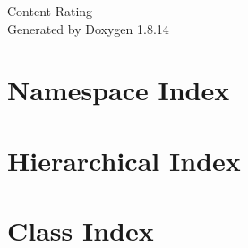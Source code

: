 \documentclass[twoside]{book}
\newcommand{\+}{\discretionary{\mbox{\scriptsize$\hookleftarrow$}}{}{}}
\newcommand{\clearemptydoublepage}{%
  \newpage{\pagestyle{empty}\cleardoublepage}%
}
\begin{document}
\hypersetup{pageanchor=false,
             bookmarksnumbered=true,
             pdfencoding=unicode
            }
\begin{titlepage}
\vspace*{7cm}
\begin{center}%
{\Large Content Rating }\\
\vspace*{1cm}
{\large Generated by Doxygen 1.8.14}\\
\end{center}
\end{titlepage}
\clearemptydoublepage
{}
\tableofcontents
\clearemptydoublepage
{}
\hypersetup{pageanchor=true}

\chapter{Namespace Index}

\chapter{Hierarchical Index}

\chapter{Class Index}

\end{document}
